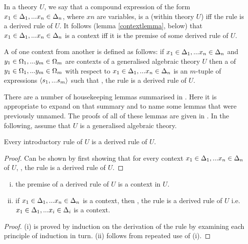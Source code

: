 In a theory $U$, we say that a compound expression of the form $x_1 \in \Delta_1,... x_{n} \in \Delta_{n}$, where $xn$ are variables, is a  (within theory $U$)  iff
the rule  is a derived rule of $U$. It follows (lemma \ref{contextlemma}, below)  that  $x_1 \in \Delta_1,... x_{n} \in \Delta_{n}$ is a context iff
it is the premise of some derived rule of $U$.

A  of one context from another is defined as follows: if $x_1 \in \Delta_1,... x_{n} \in \Delta_{n}$ and $y_1 \in \Omega_1,... y_{m} \in \Omega_{m}$ are contexts of a generalised algebraic theory $U$  then a  of  $y_1 \in \Omega_1,... y_{m} \in \Omega_{m}$ with respect to $x_1 \in \Delta_1,... x_{n} \in \Delta_{n}$ is an $m$-tuple of expressions $\langle s_1,...s_m\rangle$
such that \foreachj, the rule  is a derived rule of $U$.

There are a number of housekeeping lemmas summarised in \cite{Cartmell86}. 
Here it is appropriate to expand on that summary and to name some lemmas that were previously unnamed. The proofs of all of these lemmas 
are given in \cite{Cartmell78}.
In the following, assume that $U$ is a generalised algebraic theory.


\begin{lemma}
Every introductory rule of $U$ is a derived rule of $U$.
\end{lemma}
\begin{proof}
Can be shown by first showing that for every context $x_1 \in \Delta_1,... x_{n} \in \Delta_{n}$ of $U$, 
\foreachi, the rule 
 is a derived rule of $U$.
\end{proof}



\begin{lemma}
\begin{enumerate}[(i)]
\item the premise of a derived rule of $U$ is a context in $U$.
\item if $x_1 \in \Delta_1,... x_{n} \in \Delta_{n}$ is a context, then \foreachi, the rule  is a derived rule of $U$ i.e.
$x_1 \in \Delta_1,... x_{i} \in \Delta_{i}$ is a context.
\end{enumerate}
\end{lemma}
\begin{proof}
(i) is proved by induction on the derivation of the rule by examining each principle of induction in turn. (ii) follows from repeated use of (i).
\end{proof}

